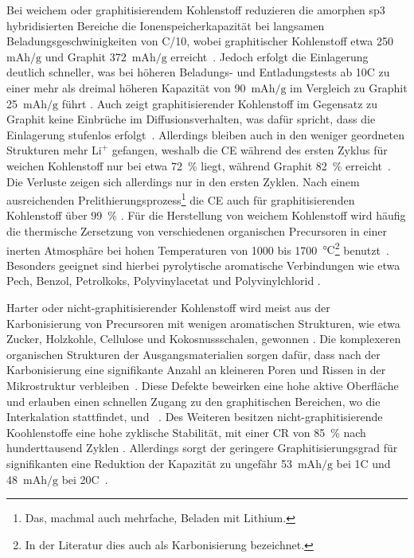 Bei weichem oder graphitisierendem Kohlenstoff reduzieren die amorphen sp3 hybridisierten Bereiche die Ionenspeicherkapazität bei langsamen Beladungsgeschwinigkeiten von C/10, wobei graphitischer Kohlenstoff etwa 250~$\si{\mA \hour \per \g}$ und Graphit 372~$\si{\mA \hour \per \g}$ erreicht~\cite{Schroeder2014}. Jedoch erfolgt die Einlagerung deutlich schneller, was bei höheren Beladungs- und Entladungstests ab 10C zu einer mehr als dreimal höheren Kapazität von 90~$\si{\mA \hour \per \g}$ im Vergleich zu Graphit 25~$\si{\mA \hour \per \g}$ führt \cite{Schroeder2014}. Auch zeigt graphitisierender Kohlenstoff im Gegensatz zu Graphit keine Einbrüche im Diffusionsverhalten, was dafür spricht, dass die Einlagerung stufenlos erfolgt~\cite{Huajun2007}. Allerdings bleiben auch in den weniger geordneten Strukturen mehr $\text{Li}^{+}$ gefangen, weshalb die CE während des ersten Zyklus für weichen Kohlenstoff nur bei etwa 72~\% liegt, während Graphit 82~\% erreicht~\cite{Schroeder2014}. Die Verluste zeigen sich allerdings nur in den ersten Zyklen. Nach einem ausreichenden Prelithierungsprozess\footnote{Das, machmal auch mehrfache, Beladen mit Lithium.} die CE auch für graphitisierenden Kohlenstoff über 99~\% \cite{Schroeder2014}. Für die Herstellung von weichem Kohlenstoff wird häufig die thermische Zersetzung von verschiedenen organischen Precursoren in einer inerten Atmosphäre bei hohen Temperaturen von 1000 bis 1700~$\si{\degreeCelsius}$\footnote{In der Literatur dies auch als Karbonisierung bezeichnet.} benutzt~\cite{Ghosh2024,Kim2017a}. Besonders geeignet sind hierbei pyrolytische aromatische Verbindungen wie etwa Pech, Benzol, Petrolkoks, Polyvinylacetat und Polyvinylchlorid \cite{Wang2021}.

Harter oder nicht-graphitisierender Kohlenstoff wird meist aus der Karbonisierung von Precursoren mit wenigen aromatischen Strukturen, wie etwa Zucker, Holzkohle, Cellulose und Kokosnussschalen, gewonnen \cite{Wang2021}. Die komplexeren organischen Strukturen der Ausgangsmaterialien sorgen dafür, dass nach der Karbonisierung eine signifikante Anzahl an kleineren Poren und Rissen in der Mikrostruktur verbleiben~\cite{Liu2019a}. Diese Defekte beweirken eine hohe aktive Oberfläche und erlauben einen schnellen Zugang zu den graphitischen Bereichen, wo die Interkalation stattfindet, und ~\cite{Fujimoto2010}. Des Weiteren besitzen nicht-graphitisierende Koohlenstoffe eine hohe zyklische Stabilität, mit einer CR von 85~\% nach hunderttausend Zyklen \cite{Cao2014}. Allerdings sorgt der geringere Graphitisierungsgrad für signifikanten eine Reduktion der Kapazität zu ungefähr 53~$\si{\mA \hour \per \g}$ bei 1C und 48~$\si{\mA \hour \per \g}$ bei 20C~\cite{Sun2017}.

